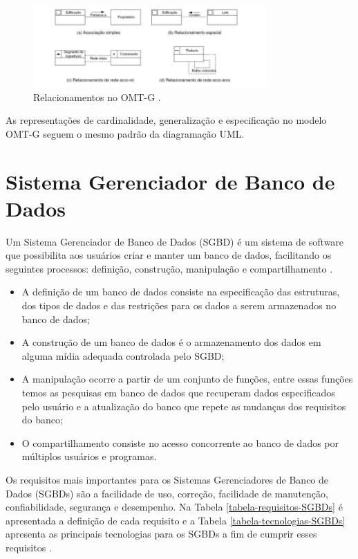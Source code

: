 \begin{figure}[h]
\centering
\includegraphics[width=0.80\textwidth]{./img/cap_II/10-RelacionamentosOMTG}
\caption{Relacionamentos no OMT-G \cite{omtg}.}
\label{fig:RelacionamentosOMTG}
\end{figure}

As representações de cardinalidade, generalização e especificação no modelo OMT-G seguem o mesmo padrão da diagramação UML.

\section{Sistema Gerenciador de Banco de Dados}

Um Sistema Gerenciador de Banco de Dados (SGBD) é um sistema de software que possibilita aos usuários criar e manter um banco de dados, facilitando os seguintes processos: definição, construção, manipulação e compartilhamento \cite{bancodados}.

\begin{itemize}
\item A definição de um banco de dados consiste na especificação das estruturas, dos tipos de dados e das restrições para os dados a serem armazenados no banco de dados;
\item A construção de um banco de dados é o armazenamento dos dados em alguma mídia adequada controlada pelo SGBD;
\item A manipulação ocorre a partir de um conjunto de funções, entre essas funções temos as pesquisas em banco de dados que recuperam dados especificados pelo usuário e a atualização do banco que repete as mudanças dos requisitos do banco;
\item O compartilhamento consiste no acesso concorrente ao banco de dados por múltiplos usuários e programas.
\end{itemize}

Os requisitos mais importantes para os Sistemas Gerenciadores de Banco de Dados (SGBDs) são a facilidade de uso, correção, facilidade de manutenção, confiabilidade, segurança e desempenho. Na Tabela \ref{tabela-requisitos-SGBDs} é apresentada a definição de cada requisito e a Tabela \ref{tabela-tecnologias-SGBDs} apresenta as principais tecnologias para os SGBDs a fim de cumprir esses requisitos \cite{queirozferreira}.

